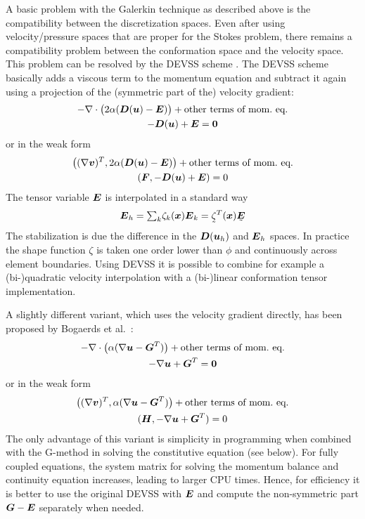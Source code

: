 A basic problem with the Galerkin technique as described above is the
compatibility between the discretization spaces. Even after using 
velocity/pressure spaces that are proper for the Stokes problem, there remains
a compatibility problem between the conformation space and the velocity space.
This problem can be resolved by the DEVSS scheme \cite{Guenette95}. The DEVSS
scheme
basically adds a viscous term to the momentum equation and subtract it again
using a projection of the (symmetric part of the) velocity gradient:
\begin{gather}
  -\nabla\cdot\big(2\alpha ( \boldsymbol{D}(\boldsymbol{u}) - \boldsymbol{E} )\big)
        + \text{other terms of mom.\ eq.}\\
   -\boldsymbol{D}(\boldsymbol{u}) + \boldsymbol{E} = \boldsymbol{0}
\end{gather}
or in the weak form
\begin{gather}
  \big((\nabla\boldsymbol{v})^T,2\alpha(\boldsymbol{D}(\boldsymbol{u}) - \boldsymbol{E})\big)
          + \text{other terms of mom.\ eq.}\\
   (\boldsymbol{F},-\boldsymbol{D}(\boldsymbol{u}) + \boldsymbol{E}) = 0
\end{gather}
The tensor variable $\boldsymbol{E}$ is interpolated in a standard way
\begin{equation}
  \ten E_h=\tsum_k \zeta_k(\vek x)\ten E_k=\col\zeta^T(\vek x)\col{\ten E}
\end{equation}
The stabilization is due the difference in the $\boldsymbol{D}(\boldsymbol{u}_h)$ and
$\boldsymbol{E}_h$ spaces. In practice the shape function $\zeta$ is taken one order
lower than $\phi$ and continuously across element boundaries. Using DEVSS it is
possible to combine for example a (bi-)quadratic velocity interpolation
with a (bi-)linear conformation tensor implementation.

A slightly different variant, which uses the velocity gradient directly, has
been proposed by Bogaerds et al.\ \cite{Bogaerds02}:
\begin{gather}
  -\nabla\cdot\big(\alpha ( \nabla\boldsymbol{u} - \boldsymbol{G}^T )\big)
      + \text{other terms of mom.\ eq.}\\
   -\nabla\boldsymbol{u} + \boldsymbol{G}^T = \boldsymbol{0}
\end{gather}
or in the weak form
\begin{gather}
  \big((\nabla\boldsymbol{v})^T,\alpha(\nabla\boldsymbol{u} - \boldsymbol{G}^T)\big)
          + \text{other terms of mom.\ eq.}\\
   (\boldsymbol{H},-\nabla\boldsymbol{u} + \boldsymbol{G}^T) = 0\label{eq:Gproj}
\end{gather}
The only advantage of this variant is simplicity in programming when combined
with the G-method in solving the constitutive equation (see below). For fully
coupled equations, the system matrix for solving the momentum
balance and continuity equation increases, leading to larger CPU times. Hence,
for efficiency it is better to use the original DEVSS with $\boldsymbol{E}$ and compute
the non-symmetric part $\boldsymbol{G}-\boldsymbol{E}$ separately when needed.


